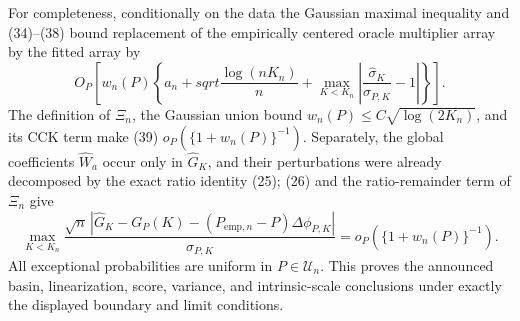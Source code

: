 For completeness, conditionally on the data the Gaussian maximal inequality and (34)--(38) bound replacement of the empirically centered oracle multiplier array by the fitted array by
\[
 O_P\!\left[w_n(P)\left\{a_n+sqrt{\frac{\log(nK_n)}n}
 +\max_{K<K_n}\left|\frac{\widehat\sigma_K}{\sigma_{P,K}}-1\right|\right\}\right]. \tag{39}
\]
The definition of \(\Xi_n\), the Gaussian union bound \(w_n(P)\leq C\sqrt{\log(2K_n)}\), and its CCK term make (39) \(o_P(\{1+w_n(P)\}^{-1})\).  Separately, the global coefficients \(\widehat W_a\) occur only in \(\widehat G_K\), and their perturbations were already decomposed by the exact ratio identity (25); (26) and the ratio-remainder term of \(\Xi_n\) give
\[
 \max_{K<K_n}
 \frac{\sqrt n\,|\widehat G_K-G_P(K)-(P_{\mathrm{emp},n}-P)\Delta\phi_{P,K}|}
 {\sigma_{P,K}}
 =o_P\!\left(\{1+w_n(P)\}^{-1}\right).                                        \tag{40}
\]
All exceptional probabilities are uniform in \(P\in\mathcal U_n\).  This proves the announced basin, linearization, score, variance, and intrinsic-scale conclusions under exactly the displayed boundary and limit conditions.